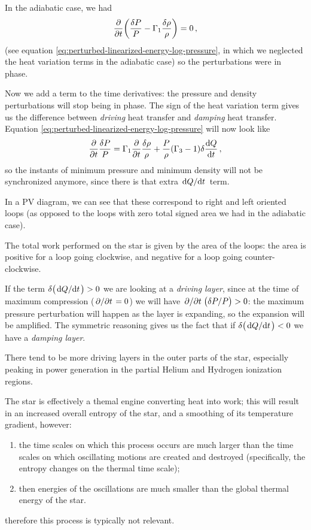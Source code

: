 \documentclass[main.tex]{subfiles}
\begin{document}
In the adiabatic case, we had 
%
\begin{align}
\pdv{}{t}\qty( \frac{\delta P}{P} - \Gamma_1 \frac{\delta \rho}{\rho}) =0
\,,
\end{align}
%
(see equation \eqref{eq:perturbed-linearized-energy-log-pressure}, in which we neglected the heat variation terms in the adiabatic case) so the perturbations were in phase.

Now we add a term to the time derivatives: the pressure and density perturbations will stop being in phase. The sign of the heat variation term gives us the difference between \emph{driving} heat transfer and \emph{damping} heat transfer. Equation \eqref{eq:perturbed-linearized-energy-log-pressure} will now look like 
%
\begin{align}
\pdv{}{t} \frac{ \delta P}{P} = \Gamma_1 \pdv{}{t} \frac{ \delta \rho }{\rho } + \frac{P}{\rho } (\Gamma_3 -1) \delta \dv{Q}{t}
\,,
\end{align}
%
so the instants of minimum pressure and minimum density will not be synchronized anymore, since there is that extra \(\dv*{Q}{t}\) term. 

In a PV diagram, we can see that these correspond to right and left oriented loops (as opposed to the loops with zero total signed area we had in the adiabatic case).

The total work performed on the star is given by the area of the loops: the area is positive for a loop going clockwise, and negative for a loop going counter-clockwise.

If the term \(\delta \qty(\dv*{Q}{t})>0\) we are looking at a \emph{driving layer}, since at the time of maximum compression (\(\pdv*{}{t} (\delta \rho  / \rho ) = 0\)) we will have \(\pdv*{}{t} \qty(\delta P / P) > 0\): the maximum pressure perturbation will happen as the layer is expanding, so the expansion will be amplified.
The symmetric reasoning gives us the fact that if \(\delta \qty(\dv*{Q}{t}) < 0\) we have a \emph{damping layer}. 

There tend to be more driving layers in the outer parts of the star, especially peaking in power generation in the partial Helium and Hydrogen ionization regions.  


\begin{bluebox}
The star is effectively a themal engine converting heat into work; this will result in an increased overall entropy of the star, and a smoothing of its temperature gradient, however:
%
\begin{enumerate}
\item the time scales on which this process occurs are much larger than the time scales on which oscillating motions are created and destroyed (specifically, the entropy changes on the thermal time scale);
\item then energies of the oscillations are much smaller than the global thermal energy of the star.
\end{enumerate}
%
therefore this process is typically not relevant.
\end{bluebox}
\end{document}
